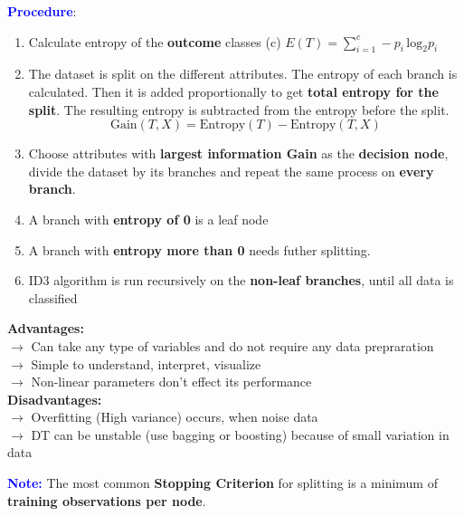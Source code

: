 \documentclass[letterpaper, 10.5pt,landscape]{article}
\begin{document}
\begin{multicols*}{3}
\textbf{\textcolor{blue}{Procedure}}:
\vspace{-3pt}
\begin{enumerate}
    \item Calculate entropy of the \textbf{outcome} classes (c) \(\boxed{E(T) = \sum^{c}_{i=1} -p_{i} \, \text{log}_{2}p_{i}} \)
    \vspace{-2pt}
    \item The dataset is split on the different attributes. The entropy of each branch is calculated. Then it is added proportionally to get \textbf{total entropy for the split}. The resulting entropy is subtracted from the entropy before the split.
    \vspace{-5pt}
    \[\boxed{\text{Gain}(T,X) = \text{Entropy}(T) - \text{Entropy}(T, X) }\]
    \vspace{-10pt}
    \item Choose attributes with \textbf{largest information Gain} as the \textbf{decision node}, divide the dataset by its branches and repeat the same process on \textbf{every branch}.
    \vspace{-2pt}
    \item A branch with \textbf{entropy of 0} is a leaf node
    \vspace{-2pt}
    \item A branch with \textbf{entropy more than 0} needs futher splitting.
    \vspace{-2pt}
    \item ID3 algorithm is run recursively on the \textbf{non-leaf branches}, until all data is classified
    \vspace{-2pt}
\end{enumerate}

\textbf{Advantages:} \\
$\rightarrow$ Can take any type of variables and do not require any data prepraration \\
$\rightarrow$ Simple to understand, interpret, visualize \\
$\rightarrow$ Non-linear parameters don't effect its performance \\

\vspace{3pt}
\textbf{Disadvantages:} \\
$\rightarrow$ Overfitting (High variance) occurs, when noise data \\
$\rightarrow$ DT can be unstable (use bagging or boosting) because of small variation in data

\vspace{3pt}
\textbf{\textcolor{blue}{Note:}}  The most common \textbf{Stopping Criterion} for splitting is a
minimum of \textbf{training observations per node}.




\end{multicols*}
\end{document}
